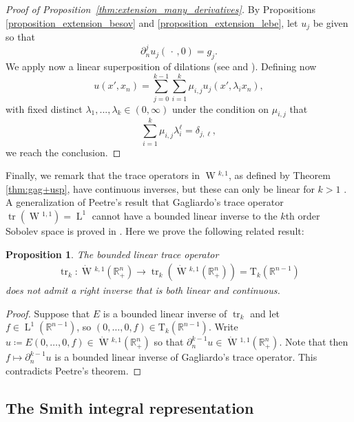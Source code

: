 \documentclass[a4paper,10pt]{amsart}
\newcommand{\R}{\mathbb R}
\DeclareMathOperator{\tr}{tr}
\newcommand{\lebe}{\operatorname{L}}
\newcommand{\sobo}{\operatorname{W}}
\numberwithin{equation}{section}
\newtheorem{proposition}[theorem]{Proposition}
\theoremstyle{remark}
\numberwithin{equation}{section}
\begin{document}
	\begin{proof}[Proof of Proposition~\ref{thm:extension_many_derivatives}]
		By Propositions \ref{proposition_extension_besov} and \ref{proposition_extension_lebe}, let \(u_j\) be given so that 
		\begin{equation*}
			\partial_n^j u_j (\,\cdot\,, 0) = g_j.
		\end{equation*}
		We apply now a linear superposition of dilations (see \cite[Thm. 2.2]{Lions_Magenes} and \cite[Thm. 4.26]{Adams}).
		Defining now 
		\begin{equation*}
			u (x', x_n) = \sum_{j = 0}^{k -1} \sum_{i = 1}^k \mu_{i, j} u_j (x',\lambda_i x_n),
		\end{equation*}
		with fixed distinct $\lambda_{1},...,\lambda_{k}\in(0,\infty)$ 
		under the condition on $\mu_{i,j}$ that 
		\begin{equation*}
			\sum_{i = 1}^k \mu_{i, j} \lambda_i^\ell  = \delta_{j, \ell},
		\end{equation*}
		we reach the conclusion.
	\end{proof}
	Finally, we remark that the  trace operators in ${\sobo}{^{k,1}}$, as defined by Theorem \ref{thm:gag+usp},  have continuous inverses, but these can only be linear for $k>1$ \cite{peetre,MR}. A generalization of Peetre's result that Gagliardo's trace operator $\tr ({\sobo}{^{1,1}})=\lebe^1$ cannot have a bounded linear inverse to the $k$th order Sobolev space is proved in \cite[Thm. 5.1]{PW2}. Here we prove the following related result:
	\begin{proposition}
		The bounded linear trace operator 
		\begin{align*}
			\tr_k \colon {\dot{\sobo}}{^{k,1}}(\R^n_+)\to \tr_{k}({\dot{\sobo}}{^{k,1}}(\R^n_+))=\mathrm T_k(\R^{n-1})
		\end{align*}
		does not admit a right inverse that is both linear and continuous.
	\end{proposition}
	\begin{proof}
		Suppose that $E$ is a bounded linear inverse of $\tr_k$ and let $f\in\lebe^1(\R^{n-1})$, so $(0,\ldots,0,f)\in\mathrm T_k(\R^{n-1})$. Write $u\coloneqq E(0,\ldots,0,f)\in {\dot{\sobo}}{^{k,1}}(\R^n_+)$ so that $\partial_n^{k-1}u\in{\dot{\sobo}}{^{1,1}}(\R^n_+)$. Note that then $f\mapsto \partial_n^{k-1}u$ is a bounded linear inverse of Gagliardo's trace operator. This contradicts Peetre's theorem.
	\end{proof}
	
	\subsection{The Smith integral representation}
	
\end{document}
